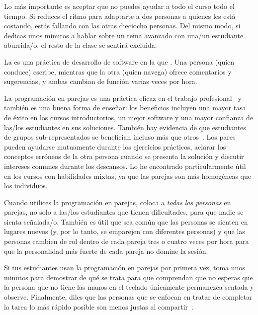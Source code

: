 Lo más importante es aceptar que
no puedes ayudar a todo el curso todo el tiempo.
Si reduces el ritmo para adaptarte a dos personas a quienes les está costando,
estás fallando con las otras dieciocho personas.
Del mismo modo,
si dedicas unos minutos a hablar sobre un tema avanzado con una/un estudiante aburrida/o,
el resto de la clase se sentirá excluida.


La  es una práctica de desarrollo de software
en la que .
Una persona (quien conduce) escribe,
mientras que la otra (quien navega) ofrece comentarios y sugerencias,
y ambas cambian de función varias veces por hora.

La programación en parejas es una práctica eficaz en el trabajo profesional~\cite{Hann2009}
y también es una buena forma de enseñar:
los beneficios incluyen una mayor tasa de éxito en los cursos introductorios,
un mejor software
y una mayor confianza de las/los estudiantes en sus soluciones.
También hay evidencia de que estudiantes de grupos sub-representados
se benefician incluso más que otros~\cite{McDo2006,Hank2011,Port2013,Cele2018}.
Los pares pueden ayudarse mutuamente durante los ejercicios prácticos,
aclarar los conceptos erróneos de la otra persona cuando se presenta la solución
y discutir intereses comunes durante los descansos.
Lo he encontrado particularmente útil en los cursos con habilidades mixtas,
ya que las parejas son más homogéneas que los individuos.

Cuando utilices la programación en parejas,
coloca a \emph{todas las personas} en parejas,
no solo a las/los estudiantes que tienen dificultades,
para que nadie se sienta señalada/o.
También es útil que sea común que las personas se sienten en lugares nuevos
(y, por lo tanto, se emparejen con diferentes personas)
y que las personas cambien de rol dentro de cada pareja tres o cuatro veces por hora
para que la personalidad más fuerte de cada pareja no domine la sesión.

Si tus estudiantes usan la programación en parejas por primera vez,
toma unos minutos para demostrar de qué se trata
para que comprendan que
no esperas que la persona que no tiene las manos en el teclado
únicamente permanezca sentada y observe.
Finalmente,
diles que las personas que se enfocan en tratar de completar la tarea lo más rápido posible
son menos justas al compartir~\cite{Lewi2015}.

